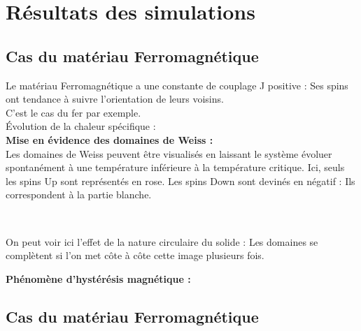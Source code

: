 \section{Résultats des simulations}
\subsection{Cas du matériau Ferromagnétique}
Le matériau Ferromagnétique a une constante de couplage J positive : Ses spins ont tendance à suivre l'orientation de leurs voisins.\\
C'est le cas du fer par exemple.\\

Évolution de la chaleur spécifique :\\




\textbf{Mise en évidence des domaines de Weiss :}\\
Les domaines de Weiss peuvent être visualisés en laissant le système évoluer spontanément à une température inférieure à la température critique. Ici, seuls les spins Up sont représentés en rose. Les spins Down sont devinés en négatif : Ils correspondent à la partie blanche.
\begin{center}
\\
\end{center}
On peut voir ici l'effet de la nature circulaire du solide : Les domaines se complètent si l'on met côte à côte cette image plusieurs fois.

\textbf{Phénomène d'hystérésis magnétique :}\\


\subsection{Cas du matériau Ferromagnétique}